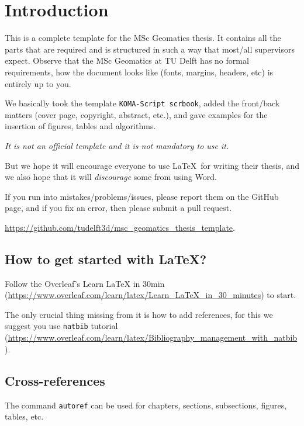 
\chapter{Introduction}%
\label{chap:introduction}


This is a complete template for the MSc Geomatics thesis.
It contains all the parts that are required and is structured in such a way that most/all supervisors expect.
Observe that the MSc Geomatics at TU Delft has no formal requirements, how the document looks like (fonts, margins, headers, etc) is entirely up to you. 

We basically took the template \texttt{KOMA-Script scrbook}, added the front/back matters (cover page, copyright, abstract, etc.), and gave examples for the insertion of figures, tables and algorithms.

\emph{It is not an official template and it is not mandatory to use it.}

But we hope it will encourage everyone to use \LaTeX\ for writing their thesis, and we also hope that it will \emph{discourage} some from using Word.

If you run into mistakes/problems/issues, please report them on the GitHub page, and if you fix an error, then please submit a pull request. 

\url{https://github.com/tudelft3d/msc_geomatics_thesis_template}.


%
\section{How to get started with \LaTeX?}%
\label{sec:startlatex}



Follow the Overleaf's Learn LaTeX in 30min (\url{https://www.overleaf.com/learn/latex/Learn_LaTeX_in_30_minutes}) to start.

The only crucial thing missing from it is how to add references, for this we suggest you use \texttt{natbib} tutorial (\url{https://www.overleaf.com/learn/latex/Bibliography_management_with_natbib}).

%
\section{Cross-references}

The command \texttt{autoref} can be used for chapters, sections, subsections, figures, tables, etc.


